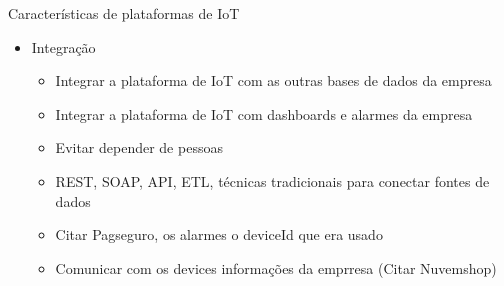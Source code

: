 \begin{frame}
	\begin{block}{Características de plataformas de IoT}
		 \begin{itemize}
			  \item Integração 
		 		\begin{itemize}
		 			\item Integrar a plataforma de IoT com as outras bases de dados da empresa
		 			\item Integrar a plataforma de IoT com dashboards e alarmes da empresa
		 			\item Evitar depender de pessoas
		 			\item REST, SOAP, API, ETL, técnicas tradicionais para conectar fontes de dados
		 			\item Citar Pagseguro, os alarmes o deviceId que era usado
		 			\item Comunicar com os devices informações da emprresa (Citar Nuvemshop)
		  		\end{itemize}
		  \end{itemize}
	\end{block}
\end{frame}

